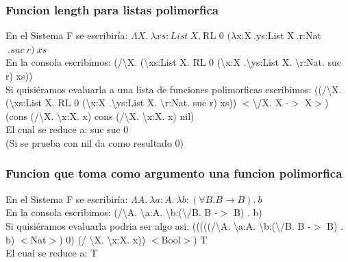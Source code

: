\documentclass[12pt, titlepage, a4paper]{article}
\begin{document}
\subsubsection{Funcion length para listas polimorfica}
\noindent En el Sistema F se escribiría: $\Lambda X.\ \lambda xs:List \ X. \ $RL 0 $(\lambda $x:X$ \ .$ys:List X$ \ .$r:Nat$\ .suc\ r)\ xs$ \\
En la consola escribimos: (/\textbackslash X. (\textbackslash xs:List X. RL 0 (\textbackslash x:X .\textbackslash ys:List X. \textbackslash r:Nat. suc r) xs)) \\
Si quisiéramos evaluarla a una lista de funciones polimorficas escribimos: 
((/\textbackslash X. (\textbackslash xs:List X. RL 0 (\textbackslash x:X .\textbackslash ys:List X. \textbackslash r:Nat. suc r) xs)) $<$\textbackslash/X. X -$>$ X$>$) 
(cons (/\textbackslash X. \textbackslash x:X. x) cons (/\textbackslash X. \textbackslash x:X. x) nil)\\
El cual se reduce a: suc suc 0 \\

\noindent (Si se prueba con nil da como resultado 0)

\subsubsection{Funcion que toma como argumento una funcion polimorfica}
\noindent En el Sistema F se escribiría: $\Lambda A.\ \lambda a:A.\ \lambda b:(\forall B. B \rightarrow  B). \ b$ \\
En la consola escribimos: (/\textbackslash A. \textbackslash a:A. \textbackslash b:(\textbackslash /B. B -$>$ B) . b)\\
Si quisiéramos evaluarla podria ser algo asi: (((((/\textbackslash A. \textbackslash a:A. \textbackslash b:(\textbackslash /B. B -$>$ B) . b) $<$Nat$>$) 0) (/ \textbackslash X. \textbackslash x:X. x)) $<$Bool$>$) T\\
El cual se reduce a: T




\end{document}
